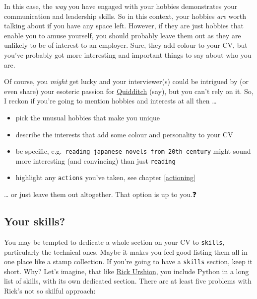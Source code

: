 \documentclass[
]{book}
\providecommand{\tightlist}{%
  \setlength{\itemsep}{0pt}\setlength{\parskip}{0pt}}
\begin{document}
In this case, the \emph{way} you have engaged with your hobbies demonstrates your communication and leadership skills. So in this context, your hobbies \emph{are} worth talking about if you have any space left. However, if they are just hobbies that enable you to amuse yourself, you should probably leave them out as they are unlikely to be of interest to an employer. Sure, they add colour to your CV, but you've probably got more interesting and important things to say about who you are.

Of course, you \emph{might} get lucky and your interviewer(s) could be intrigued by (or even share) your esoteric passion for \href{https://en.wikipedia.org/wiki/Quidditch_(real-life_sport)}{Quidditch} (say), but you can't rely on it. So, I reckon if you're going to mention hobbies and interests at all then \ldots{}

\begin{itemize}
\tightlist
\item
  pick the unusual hobbies that make you unique
\item
  describe the interests that add some colour and personality to your CV
\item
  be specific, e.g.~\texttt{reading\ japanese\ novels\ from\ 20th\ century} might sound more interesting (and convincing) than just \texttt{reading}
\item
  highlight any \texttt{actions} you've taken, see chapter \ref{actioning}
\end{itemize}

\ldots{} or just leave them out altogether. That option is up to you.❓

\hypertarget{mycvsk}{%
\subsection{Your skills?}\label{mycvsk}}

You may be tempted to dedicate a whole section on your CV to \texttt{skills}, particularly the technical ones. Maybe it makes you feel good listing them all in one place like a stamp collection. If you're going to have a \texttt{skills} section, keep it short. Why? Let's imagine, that like \href{Rick_Urshion.pdf}{Rick Urshion}, you include Python in a long list of skills, with its own dedicated section. There are at least five problems with Rick's not so skilful approach:
\end{document}
